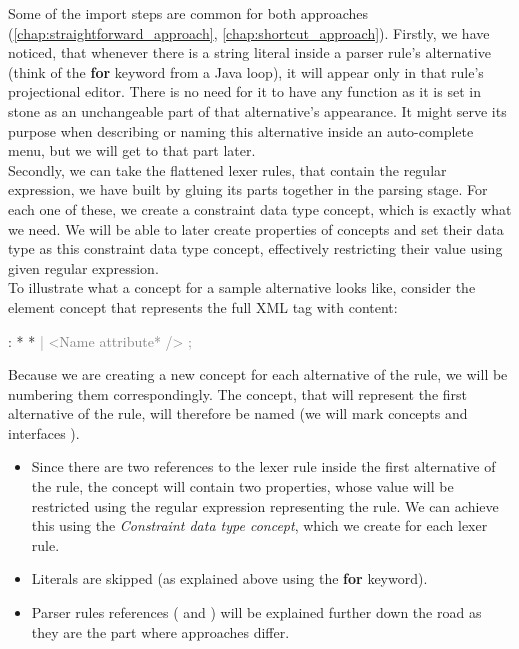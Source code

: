 Some of the import steps are common for both approaches (\ref{chap:straightforward_approach}, \ref{chap:shortcut_approach}).
Firstly, we have noticed, that whenever there is a string literal inside a parser rule's alternative (think of the \textbf{for} keyword from a Java loop), it will appear only in that rule's projectional editor.
There is no need for it to have any function as it is set in stone as an unchangeable part of that alternative's appearance.
It might serve its purpose when describing or naming this alternative inside an auto-complete menu, but we will get to that part later.
\\

Secondly, we can take the flattened lexer rules, that contain the regular expression, we have built by gluing its parts together in the parsing stage.
For each one of these, we create a constraint data type concept, which is exactly what we need.
We will be able to later create properties of concepts and set their data type as this constraint data type concept, effectively restricting their value using given regular expression.
\\

To illustrate what a concept for a sample alternative looks like, consider the element concept that represents the full XML tag with content:

\begin{antlr}
	      :   \literal{<}  * \literal{>} * \literal{</}  \literal{>}
             \textcolor{gray}{|   \ap<\ap Name attribute* \ap/>\ap}
             \textcolor{gray}{;}
\end{antlr}

Because we are creating a new concept for each alternative of the rule, we will be numbering them correspondingly.
The concept, that will represent the first alternative of the  rule, will therefore be named 
(we will mark concepts  and interfaces ).

\begin{itemize}
	\item Since there are two references to the  lexer rule inside the first alternative of the  rule, the  concept will contain two properties, whose value will be restricted using the regular expression representing the  rule.
	We can achieve this using the \textit{Constraint data type concept}, which we create for each lexer rule.

	\item Literals are skipped (as explained above using the \textbf{for} keyword).

	\item Parser rules references ( and ) will be explained further down the road as they are the part where approaches differ.
\end{itemize}

